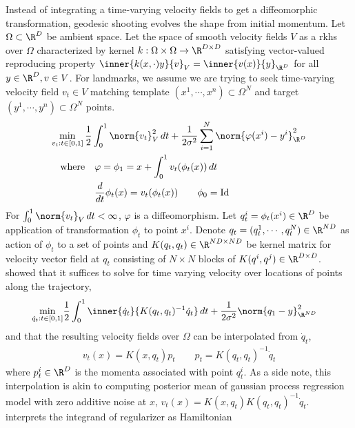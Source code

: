 \documentclass[11pt]{article}
\begin{document}
Instead of integrating a time-varying velocity fields to get a diffeomorphic transformation, geodesic shooting evolves the shape from initial momentum. Let $\Omega \subset\R^D$ be ambient space. Let the space of smooth velocity fields $V$ as a rkhs over $\Omega$ characterized by kernel $k:\Omega\times\Omega\to\R^{D\times D}$ satisfying vector-valued reproducing property $\inner{k(x,\cdot)y}{v}_{V} = \inner{v(x)}{y}_{\R^D}$ for all $y\in\R^D, v\in V$. For landmarks, we assume we are trying to seek time-varying velocity field $v_t\in V$ matching template $(x^1,\cdots,x^n)\subset \Omega^N$ and target $(y^1,\cdots,y^n)\subset\Omega^N$ points.
\begin{align}
    \min_{v_t:t\in [0,1]} \,
        &\frac{1}{2} \int_0^1 \norm{v_t}_V^2 \, dt + \frac{1}{2\sigma^2} \sum_{i=1}^N \norm{\varphi(x^i) - y^i}_{\R^{D}}^2 \\
        \text{where}
            &\quad \varphi = \phi_1 = x + \int_0^1 v_t(\phi_t(x)) \, dt \\
            &\quad \frac{d}{dt}\phi_t(x) = v_t(\phi_t(x)) \quad\quad \phi_0 = \text{Id}
\end{align}
For $\int_0^1 \norm{v_t}_V \, dt < \infty$, $\varphi$ is a diffeomorphism. Let $q_t^i = \phi_t(x^i) \in \R^D$ be application of transformation $\phi_t$ to point $x^i$. Denote $q_t = (q_t^1, \cdots, q_t^N) \in \R^{ND}$ as action of $\phi_t$ to a set of points and $K(q_t,q_t) \in \R^{ND\times ND}$ be kernel matrix for velocity vector field at $q_t$ consisting of $N\times N$ blocks of $K(q^i,q^j) \in \R^{D\times D}$. \cite{joshiLandmarkMatchingLarge2000} showed that it suffices to solve for time varying velocity over locations of points along the trajectory,
\begin{align}
    \min_{\dot{q}_t:t\in [0,1]}
        &\frac{1}{2} \int_0^1 \inner{\dot{q}_t}{K(q_t,q_t)^{-1}\dot{q}_t} \, dt + \frac{1}{2\sigma^2} \norm{q_1 - y}_{\R^{ND}}^2
\end{align}
and that the resulting velocity fields over $\Omega$ can be interpolated from $\dot{q}_t$,
\begin{align}
    v_t(x)
        = K(x, q_t) p_t
    \quad\quad
    p_t
        = K(q_t, q_t)^{-1} \dot{q}_t
\end{align}
where $p_t^i \in \R^{D}$ is the momenta associated with point $q_t^i$. As a side note, this interpolation is akin to computing posterior mean of gaussian process regression model with zero additive noise at $x$, $v_t(x) = K(x,q_t) K(q_t,q_t)^{-1} \dot{q}_t$. \cite{millerGeodesicShootingComputational2006} interprets the integrand of regularizer as Hamiltonian 
\end{document}
